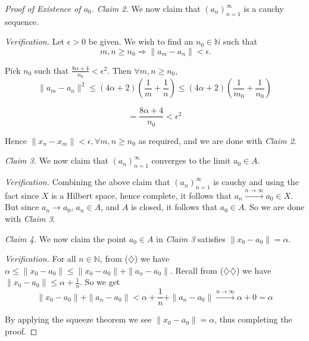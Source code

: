 \documentclass[11pt]{amsart}
\theoremstyle{definition}
\numberwithin{equation}{section}
\newcommand{\bN}{ \mathbb{N} }	%
\begin{document}
\begin{proof}[Proof of Existence of $a_0$]
\vspace{6pt}

\textit{Claim 2.} We now claim that $(a_n)^\infty_{n = 1}$ is a cauchy sequence. 

\vspace{6pt}

\textit{Verification.} Let $\epsilon > 0$ be given. We wish to find an $n_0 \in \bN$ such that
\[\  m,n \ge n_0 \Rightarrow \| a_m - a_n \| < \epsilon. \]

Pick $n_0$ such that $\frac{8 \alpha + 4} {n_0} < \epsilon^2$. Then $\forall m,n \ge n_0$, 
\[ \|a_m - a_n \|^2 \le (4\alpha + 2) \left( \frac 1 m +  \frac 1 n \right) \le (4\alpha + 2) \left( \frac 1 {m_0} +  \frac 1 {n_0} \right) \]

\[ = \frac{8 \alpha + 4} {n_0} < \epsilon^2\]

Hence $\|x_n - x_m \| < \epsilon, \forall m,n \ge n_0$ as required, and we are done with \textit{Claim 2}. 

\vspace{6pt}

\textit{Claim 3.} We now claim that $(a_n)^\infty_{n = 1}$ converges to the limit $a_0 \in A$. 

\vspace{6pt}

\textit{Verification.} Combining the above claim that $(a_n)^\infty_{n = 1}$ is cauchy and using the fact since $X$ is a Hilbert space, hence complete, it follows that $a_n \overset{n \rightarrow \infty} \rightarrow a_0 \in X$. But since $a_n \rightarrow a_0$, $a_n \in A$, and $A$ is closed, it follows that $a_0 \in A$. So we are done with \textit{Claim 3}. 

\vspace{6pt}

\textit{Claim 4.} We now claim the point $a_0 \in A$ in \textit{Claim 3} satisfies $\|x_0 - a_0 \| = \alpha$. 

\vspace{6pt}

\textit{Verification.} For all $n \in \bN$, from ($\diamondsuit$) we have $\alpha \le \|x_0 - a_0 \| \le \|x_0 - a_0 \| + \|a_n - a_0\| $.
Recall from ($\diamondsuit \diamondsuit$) we have $\|x_0 - a_0 \| \le \alpha + \frac 1 n$. So we get 
\[\|x_0 - a_0 \| + \|a_n - a_0\| < \alpha + \frac 1 n+ \|a_n - a_0\| \overset{n \rightarrow \infty} \rightarrow \alpha + 0 = \alpha\]

By applying the squeeze theorem we see $\|x_0 - a_0 \| = \alpha$, thus completing the proof.
\end{proof}
\end{document}
